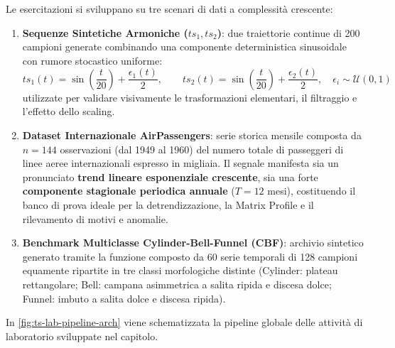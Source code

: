 Le esercitazioni si sviluppano su tre scenari di dati a complessit\`a crescente:
\begin{enumerate}
    \item \textbf{Sequenze Sintetiche Armoniche ($ts_1, ts_2$)}: due traiettorie continue di 200 campioni generate combinando una componente deterministica sinusoidale con rumore stocastico uniforme:
    \begin{equation}
    ts_1(t) = \sin\left(\frac{t}{20}\right) + \frac{\epsilon_1(t)}{2}, \qquad ts_2(t) = \sin\left(\frac{t}{20}\right) + \frac{\epsilon_2(t)}{2}, \quad \epsilon_i \sim \mathcal{U}(0, 1)
    \end{equation}
    utilizzate per validare visivamente le trasformazioni elementari, il filtraggio e l'effetto dello scaling.
    
    \item \textbf{Dataset Internazionale AirPassengers}: serie storica mensile composta da $n = 144$ osservazioni (dal 1949 al 1960) del numero totale di passeggeri di linee aeree internazionali espresso in migliaia. Il segnale manifesta sia un pronunciato \textbf{trend lineare esponenziale crescente}, sia una forte \textbf{componente stagionale periodica annuale} ($T = 12$ mesi), costituendo il banco di prova ideale per la detrendizzazione, la Matrix Profile e il rilevamento di motivi e anomalie.
    
    \item \textbf{Benchmark Multiclasse Cylinder-Bell-Funnel (CBF)}: archivio sintetico generato tramite la funzione  composto da 60 serie temporali di 128 campioni equamente ripartite in tre classi morfologiche distinte (Cylinder: plateau rettangolare; Bell: campana asimmetrica a salita ripida e discesa dolce; Funnel: imbuto a salita dolce e discesa ripida).
\end{enumerate}

In \autoref{fig:ts-lab-pipeline-arch} viene schematizzata la pipeline globale delle attivit\`a di laboratorio sviluppate nel capitolo.

